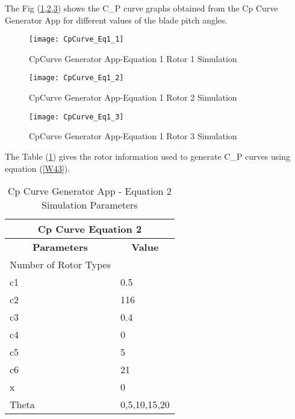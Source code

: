 The Fig (\ref{WinResImg3},\ref{WinResImg4},\ref{WinResImg5}) shows the C_{P} curve graphs obtained from the Cp Curve Generator App for different values of the blade pitch angles.

\begin{figure}[H]
\centering
\texttt{[image: CpCurve\_Eq1\_1]}
\caption{CpCurve Generator App-Equation 1 Rotor 1 Simulation}
\label{WinResImg3} %
\end{figure}

\begin{figure}[H]
\centering
\texttt{[image: CpCurve\_Eq1\_2]}
\caption{CpCurve Generator App-Equation 1 Rotor 2 Simulation}
\label{WinResImg4} %
\end{figure}
\begin{figure}[H]

\centering
\texttt{[image: CpCurve\_Eq1\_3]}
\caption{CpCurve Generator App-Equation 1 Rotor 3 Simulation}
\label{WinResImg5} %
\end{figure}

The Table (\ref{CpCurveTab2}) gives the rotor information used to generate C_{P} curves using equation (\ref{W43}).

\begin{table}[htbp]
  \centering
  \caption{Cp Curve Generator App - Equation 2 Simulation Parameters}
    \begin{tabular}{|l|l|}
    \hline
    \multicolumn{2}{|c|}{\textbf{Cp Curve Equation 2}} \bigstrut\\
    \hline
    \multicolumn{1}{|c|}{\textbf{Parameters }} & \multicolumn{1}{c|}{\textbf{Value}} \bigstrut\\
    \hline
    Number of Rotor Types &  \bigstrut\\
    \hline
    c1 & 0.5 \bigstrut\\
    \hline
    c2 & 116 \bigstrut\\
    \hline
    c3 & 0.4 \bigstrut\\
    \hline
    c4 & 0 \bigstrut\\
    \hline
    c5 & 5 \bigstrut\\
    \hline
    c6 & 21 \bigstrut\\
    \hline
    x  & 0 \bigstrut\\
    \hline
    Theta & 0,5,10,15,20 \bigstrut\\
    \hline
    \end{tabular}%
  \label{CpCurveTab2}%
\end{table}%

